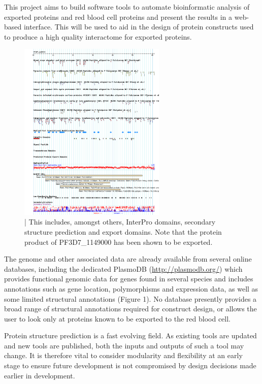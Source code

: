 \documentclass[fleqn,10pt]{article} %
\begin{document}
This project aims to build software tools to automate bioinformatic analysis of \pf exported proteins and red blood cell proteins and present the results in a web-based interface. This will be used to aid in the design of protein constructs used to produce a high quality interactome for exported \pf proteins. 


\begin{figure}
\includegraphics[width=7cm]{figs/plasmodbview}
\caption{ | This includes, amongst others, InterPro domains, secondary structure prediction and export domains. Note that the protein product of PF3D7\_1149000 has been shown to be exported.}
\end{figure}

The \pf genome and other associated data are already available from several online databases, including the dedicated PlasmoDB (\url{http://plasmodb.org/}) \cite{Aurrecoechea2009} which provides functional genomic data for genes found in several  species and includes annotations such as gene location, polymorphisms and expression data, as well as some limited structural annotations (Figure 1). No database presently provides a broad range of structural annotations required for construct design, or allows the user to look only at proteins known to be exported to the red blood cell.


Protein structure prediction is a fast evolving field. As existing tools are updated and new tools are published, both the inputs and outputs of such a tool may change. It is therefore vital to consider modularity and flexibility at an early stage to ensure future development is not compromised by design decisions made earlier in development.
\end{document}
